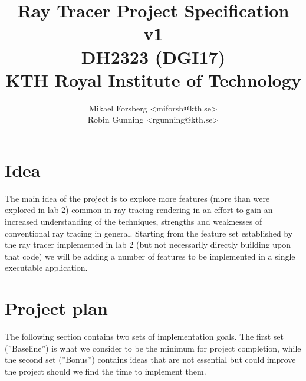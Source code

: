 \documentclass[a4paper,11pt]{article}
\begin{document}
\title{\vspace{-1cm} Ray Tracer Project Specification v1\\ \small DH2323 (DGI17)\\ KTH Royal Institute of Technology}
\author{Mikael Forsberg <miforsb@kth.se>\\ Robin Gunning <rgunning@kth.se>}
\maketitle

\section*{Idea}
The main idea of the project is to explore more features (more than were explored in lab 2) common in ray
tracing rendering in an effort to gain an increased understanding of the techniques, strengths and
weaknesses of conventional ray tracing in general. Starting from the feature set established by the
ray tracer implemented in lab 2 (but not necessarily directly building upon that code) we will be
adding a number of features to be implemented in a single executable application.

\section*{Project plan}
The following section contains two sets of implementation goals. The first set (''Baseline'') is what we consider
to be the minimum for project completion, while the second set (''Bonus'') contains ideas that are not essential
but could improve the project should we find the time to implement them.
\end{document}
